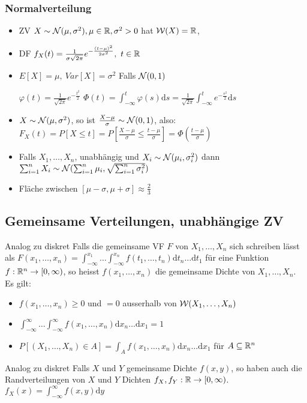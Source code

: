 \subsubsection{Normalverteilung}
\begin{itemize}
    \item ZV $X \sim \mathcal{N}(\mu, \sigma^2), \mu \in \mathbb{R}, \sigma^2 > 0$ hat $\mathcal{W}(X) = \mathbb{R}$, 
    \item DF $f_X(t) = \frac{1}{\sigma \sqrt{2 \pi}} e^{- \frac{(t - \mu)^2}{2 \sigma^2}}, \ t \in \mathbb{R}$
    \item $E[X] = \mu, \ Var[X] = \sigma^2$
     Falls $\mathcal{N}(0, 1)$
        \begin{itemize}
             $\varphi(t) = \frac{1}{\sqrt{2 \pi}} e^{-\frac{t^2}{2}}$
             $\Phi(t) = \int_{-\infty}^{t} \varphi(s) \mathrm{d}s = \frac{1}{\sqrt{2 \pi}} \int_{-\infty}^{t} e ^{-\frac{s^2}{2}}\mathrm{d}s$
        \end{itemize}
    \item $X \sim \mathcal{N}(\mu, \sigma^2)$, so ist $\frac{X - \mu}{\sigma} \sim \mathcal{N}(0, 1)$, also: $F_X(t) = P[X \le t] = P[\frac{X - \mu}{\sigma} \le \frac{t - \mu}{\sigma}] = \Phi(\frac{t - \mu}{\sigma})$
    \item Falls $X_1, \dots, X_n$, unabhängig und $X_i \sim \mathcal{N}(\mu_i, \sigma_i^2)$ dann $\sum_{i=1}^n X_i \sim \mathcal{N}(\sum_{i=1}^n \mu_i, \sqrt{\sum_{i=1}^n \sigma_i^2})$
    \item Fläche zwischen $[\mu - \sigma, \mu + \sigma] \approx \frac{2}{3}$
\end{itemize}

\subsection{Gemeinsame Verteilungen, unabhängige ZV}
\begin{itemize}
     Analog zu diskret
     Falls die gemeinsame VF $F$ von $X_1, \dots, X_n$ sich schreiben lässt als $F(x_1, \dots, x_n) = \int_{-\infty}^{x_1} \dots \int_{-\infty}^{x_n} f(t_1, \dots, t_n) \mathrm{d}t_n \dots \mathrm{d}t_1$ für eine Funktion $f: \mathbb{R}^n \to [0, \infty)$, so heisst $f(x_1, \dots, x_n)$ die gemeinsame Dichte von $X_1, \dots, X_n$. Es gilt:
        \begin{itemize}
            \item $f(x_1, \dots, x_n) \ge 0$ und $=0$ ausserhalb von $\mathcal{W}(X_1, \dots, X_n)$
            \item $\int_{-\infty}^{\infty} \dots \int_{-\infty}^{\infty} f(x_1, \dots, x_n) \mathrm{d}x_n \dots \mathrm{d}x_1 = 1$
            \item $P[(X_1, \dots, X_n) \in A] = \int_{A} f(x_1, \dots, x_n) \mathrm{d}x_n \dots \mathrm{d}x_1$ für $A \subseteq \mathbb{R}^n$
        \end{itemize}
     Analog zu diskret
     Falls $X$ und $Y$ gemeinsame Dichte $f(x,y)$, so haben auch die Randverteilungen von $X$ und $Y$ Dichten $f_X, f_Y: \mathbb{R} \to [0, \infty)$. $f_X(x) = \int_{-\infty}^{\infty} f(x, y) \mathrm{d}y$
\end{itemize}

